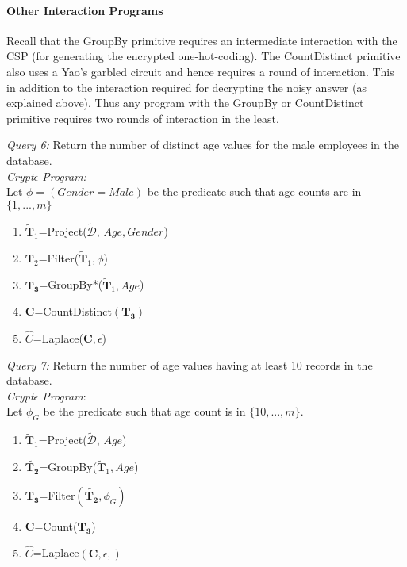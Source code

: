 \paragraph{\textbf{Other Interaction Programs}}
Recall that the GroupBy primitive requires an intermediate interaction with the CSP (for generating the encrypted one-hot-coding). The CountDistinct primitive also uses a Yao's garbled circuit and hence requires a round of interaction. This in addition to the interaction required for decrypting the noisy answer (as explained above). Thus any program with the GroupBy or CountDistinct primitive requires two rounds of interaction in the least. 
\begin{exmp}\textit{Query 6:} Return the number of distinct age values for the male employees in the database. \\ \textit{Crypt$\epsilon$ Program:} \\Let  $\phi=(Gender=Male)$ be the predicate such that age counts are in $\{1,...,m\}$ \begin{enumerate}\item $\mathbf{\tilde{T}}_1$=Project($\boldsymbol{\tilde{\mathcal{D}}}$, $Age,Gender$) \item $\mathbf{T}_2$=Filter($\mathbf{\tilde{T}}_1,\phi$) \item $\mathbf{T_3}$=GroupBy*($\mathbf{\tilde{T}}_1,Age$)\item $\mathbf{C}$=CountDistinct$(\mathbf{T_3})$\item $\hat{C}$=Laplace($\mathbf{C},\epsilon$)\end{enumerate}\end{exmp} \begin{exmp}\textit{Query 7:} Return the number of  age values having at least 10 records in the database. \\ \textit{Crypt$\epsilon$ Program}:\\ Let $\phi_G$ be the predicate such that age count is in $\{10,...,m\}$. \begin{enumerate}\item $\mathbf{\tilde{T}}_1$=Project($\boldsymbol{\tilde{\mathcal{D}}}$, $Age$) \item $\mathbf{\tilde{T_2}}$=GroupBy($\mathbf{\tilde{T}}_1,Age$)\item $\mathbf{T_3}$=Filter$(\mathbf{\tilde{T_2}},\phi_G)$\item $\mathbf{C}$=Count($\mathbf{T_3}$)\item $\hat{C}$=Laplace$(\mathbf{C},\epsilon,)$\end{enumerate}\end{exmp}